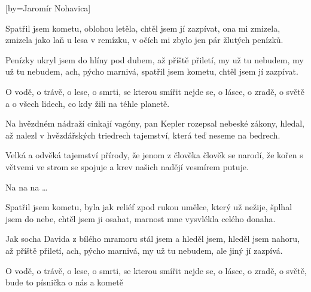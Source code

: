 [by={Jaromír Nohavica}]

\beginverse{}
Spatřil jsem kometu, oblohou letěla,
chtěl jsem jí zazpívat, ona mi zmizela,
zmizela jako laň u lesa v remízku,
v očích mi zbylo jen pár žlutých penízků.
\endverse{}

\beginverse{}
\chordsoff{}
Penízky ukryl jsem do hlíny pod dubem,
až příště přiletí, my už tu nebudem,
my už tu nebudem, ach, pýcho marnivá,
spatřil jsem kometu, chtěl jsem jí zazpívat.
\chordson{}
\endverse{}

\beginchorus{}
O vodě, o trávě, o lese,
o smrti, se kterou smířit nejde se, 
o lásce, o zradě, o světě
a o všech lidech, co kdy žili na téhle planetě. 
\endchorus{}

\beginverse{}
\chordsoff{}
Na hvězdném nádraží cinkají vagóny,
pan Kepler rozepsal nebeské zákony,
hledal, až nalezl v hvězdářských triedrech
tajemství, která teď neseme na bedrech.
\chordson{}
\endverse{}

\beginverse{}
\chordsoff{}
Velká a odvěká tajemství přírody,
že jenom z člověka člověk se narodí,
že kořen s větvemi ve strom se spojuje
a krev našich nadějí vesmírem putuje.
\chordson{}
\endverse{}

\beginchorus{}
\chordsoff{}
Na na na \ldots{}          
\chordson{}
\endchorus{}

\beginverse{}
\chordsoff{}
Spatřil jsem kometu, byla jak reliéf
zpod rukou umělce, který už nežije,
šplhal jsem do nebe, chtěl jsem ji osahat,
marnost mne vysvlékla celého donaha.
\chordson{}
\endverse{}

\beginverse{}
\chordsoff{}
Jak socha Davida z bílého mramoru
stál jsem a hleděl jsem, hleděl jsem nahoru,
až příště přiletí, ach, pýcho marnivá,
my už tu nebudem, ale jiný jí zazpívá.
\chordson{}
\endverse{}

\beginchorus{}
\chordsoff{}
O vodě, o trávě, o lese,
o smrti, se kterou smířit nejde se, 
o lásce, o zradě, o světě,
bude to písnička o nás a kometě   
\chordson{}
\endchorus{}

\endsong{}
